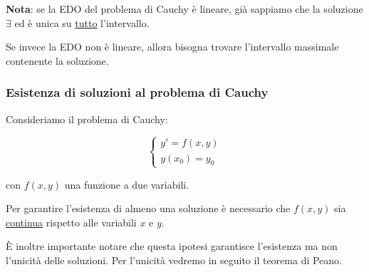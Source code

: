 \textbf{Nota}: se la EDO del problema di Cauchy è lineare, già sappiamo che la soluzione \(\exists{}\) ed è unica su \underline{tutto} l'intervallo.

Se invece la EDO non è lineare, allora bisogna trovare l'intervallo massimale contenente la soluzione.

\subsubsection{Esistenza di soluzioni al problema di Cauchy}

Consideriamo il problema di Cauchy:

\begin{equation*}
    \begin{cases*}
        y' = f(x,y) \\
        y(x_0) = y_0
    \end{cases*}
\end{equation*}

con \(f(x,y)\) una funzione a due variabili.

Per garantire l'esistenza di almeno una soluzione è necessario che \(f(x,y)\) sia \underline{continua} rispetto alle variabili \(x\) e \(y\).

È inoltre importante notare che questa ipotesi garantisce l'esistenza ma non l'unicità delle soluzioni. Per l'unicità vedremo in seguito il teorema di Peano.

